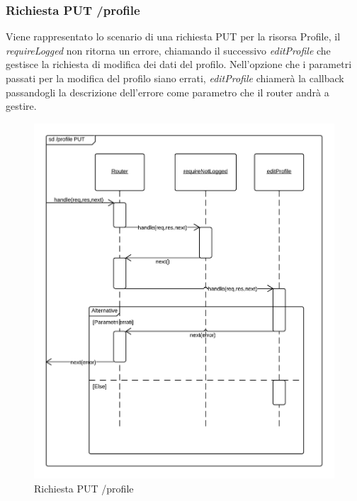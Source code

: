 \subsubsection{Richiesta PUT /profile} 
Viene rappresentato lo scenario di una richiesta PUT per la risorsa Profile, il \emph{requireLogged} non ritorna un errore, chiamando il successivo  \emph{editProfile} che gestisce la richiesta di modifica dei dati del profilo.
Nell'opzione che i parametri passati per la modifica del profilo siano errati, \emph{editProfile} chiamerà la callback passandogli la descrizione dell'errore come parametro che il router andrà a gestire.
\begin{figure}[H]
	\begin{center} 
		\includegraphics[scale=0.20]{scenari/Profile PUT.png} 
		\caption{Richiesta PUT /profile}
	\end{center} 
\end{figure}

\pagebreak
